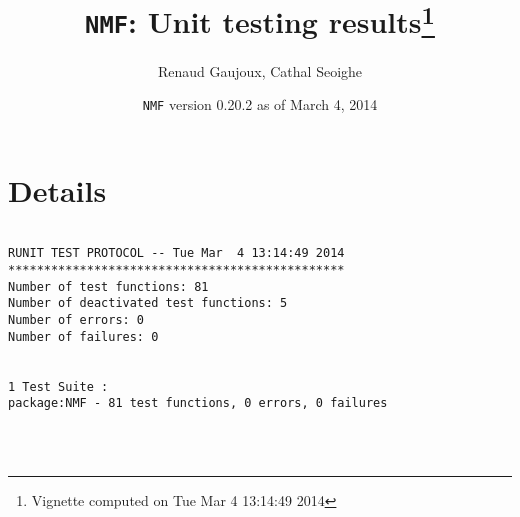 \documentclass[10pt]{article}\usepackage[]{graphicx}\usepackage[]{color}
\author{Renaud Gaujoux, Cathal Seoighe}
\title{\texttt{NMF}: Unit testing results\footnote{Vignette computed  on Tue Mar  4 13:14:49 2014}}
\date{\texttt{NMF} version 0.20.2 as of March  4, 2014}
\begin{document}
\maketitle

\section{Details}
\begin{verbatim}

RUNIT TEST PROTOCOL -- Tue Mar  4 13:14:49 2014 
*********************************************** 
Number of test functions: 81 
Number of deactivated test functions: 5 
Number of errors: 0 
Number of failures: 0 

 
1 Test Suite : 
package:NMF - 81 test functions, 0 errors, 0 failures




\end{verbatim}
\end{document}
